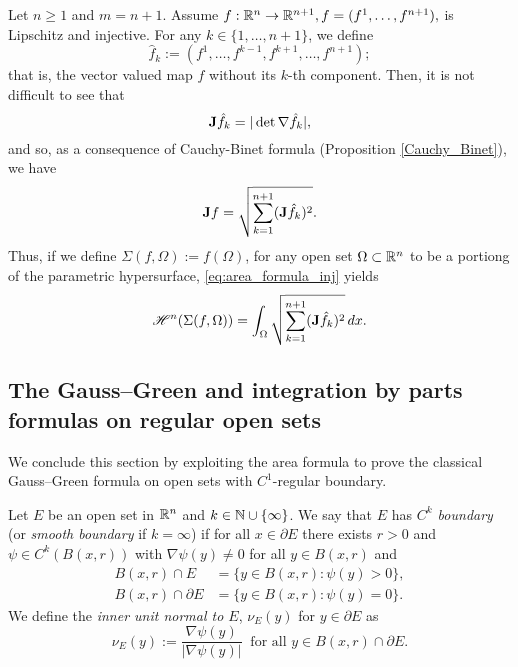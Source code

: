 \begin{example}
Let $n \ge 1$ and $m = n + 1$. Assume $f : \mathbb{R}^{n} \to \mathbb{R}^{n + 1}, f = (f^1, \dots, f^{n + 1}),$ is Lipschitz and injective. For any $k \in \{1, \dots, n + 1 \}$, we define $$\hat{f}_{k} := (f^{1}, \dots, f^{k - 1}, f^{k + 1}, \dots, f^{n + 1});$$
that is, the vector valued map $f$ without its $k$-th component. Then, it is not difficult to see that $${\bf J} \hat{f}_{k} = |\det{\nabla \hat{f}_{k}}|,$$
and so, as a consequence of Cauchy-Binet formula (Proposition \ref{Cauchy_Binet}), we have
\begin{equation*}
{\bf J} f = \sqrt{\sum_{k = 1}^{n + 1} ({\bf J} \hat{f}_{k})^{2}}.
\end{equation*}
Thus, if we define $\Sigma(f, \Omega) := f(\Omega)$, for any open set $\Omega \subset \mathbb{R}^{n}$ to be a portiong of the parametric hypersurface, \eqref{eq:area_formula_inj} yields
\begin{equation*}
\mathscr{H}^{n}(\Sigma(f, \Omega)) = \int_{\Omega} \sqrt{\sum_{k = 1}^{n + 1} ({\bf J} \hat{f}_{k})^{2}} \, dx.
\end{equation*}
\end{example}



\subsection{The Gauss--Green and integration by parts formulas on regular open sets}

We conclude this section by exploiting the area formula to prove the classical Gauss--Green formula on open sets with $C^1$-regular boundary.

\begin{definition} \label{def:C_k_boundary}
Let $E$ be an open set in $\mathbb{R}^{n}$ and $k \in \mathbb{N} \cup \{\infty\}$. We say that $E$ has {\em $C^{k}$ boundary} (or {\em smooth boundary} if $k = \infty$) if for all $x \in \partial E$ there exists $r > 0$ and $\psi \in C^{k}(B(x, r))$ with $\nabla \psi(y) \neq 0$ for all $y \in B(x, r)$ and 
\begin{align*}
B(x, r) \cap E & = \{ y \in B(x, r) : \psi(y) > 0 \}, \\
B(x, r) \cap \partial E & = \{ y \in B(x, r) : \psi(y) = 0 \}.
\end{align*}
We define the {\em inner unit normal to $E$}, $\nu_{E}(y)$ for $y \in \partial E$ as 
\begin{equation*}
\nu_{E}(y) := \frac{\nabla \psi(y)}{|\nabla \psi(y)|} \ \text{ for all } y \in B(x, r) \cap \partial E.
\end{equation*}
\end{definition}

